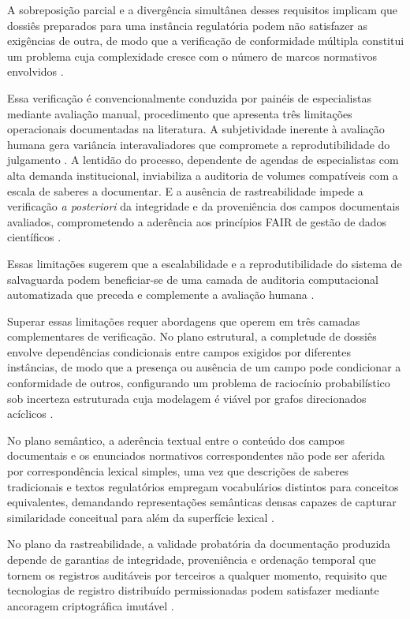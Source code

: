\documentclass[preprint,12pt,authoryear]{elsarticle}
\begin{document}
A sobreposição parcial e a divergência simultânea desses requisitos implicam que dossiês preparados para uma instância regulatória podem não satisfazer as exigências de outra, de modo que a verificação de conformidade múltipla constitui um problema cuja complexidade cresce com o número de marcos normativos envolvidos \citep{BavikatteRobinson2011,Nemoga2022}.

Essa verificação é convencionalmente conduzida por painéis de especialistas mediante avaliação manual, procedimento que apresenta três limitações operacionais documentadas na literatura. A subjetividade inerente à avaliação humana gera variância interavaliadores que compromete a reprodutibilidade do julgamento \citep{Braun2006}. A lentidão do processo, dependente de agendas de especialistas com alta demanda institucional, inviabiliza a auditoria de volumes compatíveis com a escala de saberes a documentar. E a ausência de rastreabilidade impede a verificação \textit{a posteriori} da integridade e da proveniência dos campos documentais avaliados, comprometendo a aderência aos princípios FAIR de gestão de dados científicos \citep{Wilkinson2016}.

Essas limitações sugerem que a escalabilidade e a reprodutibilidade do sistema de salvaguarda podem beneficiar-se de uma camada de auditoria computacional automatizada que preceda e complemente a avaliação humana \citep{Hashmi2018}.

Superar essas limitações requer abordagens que operem em três camadas complementares de verificação. No plano estrutural, a completude de dossiês envolve dependências condicionais entre campos exigidos por diferentes instâncias, de modo que a presença ou ausência de um campo pode condicionar a conformidade de outros, configurando um problema de raciocínio probabilístico sob incerteza estruturada cuja modelagem é viável por grafos direcionados acíclicos \citep{Pearl2009,Koller2009}. 

No plano semântico, a aderência textual entre o conteúdo dos campos documentais e os enunciados normativos correspondentes não pode ser aferida por correspondência lexical simples, uma vez que descrições de saberes tradicionais e textos regulatórios empregam vocabulários distintos para conceitos equivalentes, demandando representações semânticas densas capazes de capturar similaridade conceitual para além da superfície lexical \citep{Reimers2019,Devlin2019}.

No plano da rastreabilidade, a validade probatória da documentação produzida depende de garantias de integridade, proveniência e ordenação temporal que tornem os registros auditáveis por terceiros a qualquer momento, requisito que tecnologias de registro distribuído permissionadas podem satisfazer mediante ancoragem criptográfica imutável \citep{Hyperledger2020,Wilkinson2016}.
\end{document}
